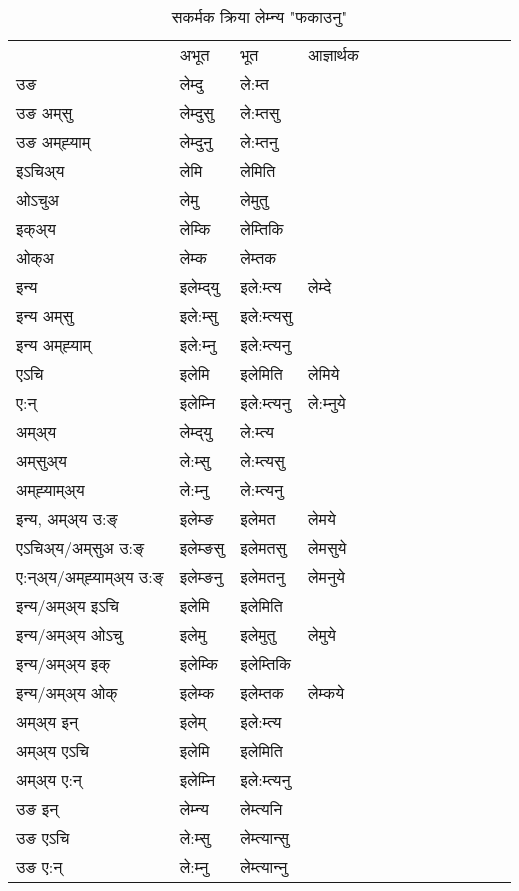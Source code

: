 \begin{table}[H]
\centering
\caption{\label{emt.vt} सकर्मक क्रिया  लेम्‍न्य  "फकाउनु"  }
\begin{tabular}{l|l|l|l|l|l|l|l|l|l|l|l|l}  \toprule
&अभूत & भूत & आज्ञार्थक \\ 
उङ &लेम्दु &ले:म्त \\ 
उङ अम्‌सु&लेम्दुसु &ले:म्तसु \\ 
उङ अम्‌ह्‍याम्&लेम्दुनु &ले:म्तनु \\ 
इऽचिअ्य &लेमि &लेमिति   \\ 
ओऽचुअ        &लेमु &लेमुतु   \\ 
इक्अ्य&लेम्कि &लेम्तिकि   \\ 
ओक्अ &लेम्क &लेम्तक   \\ 
इन्य & इलेम्द्‌यु  & इले:म्त्य &लेम्दे  \\ 
इन्य अम्‌सु& इले:म्सु  & इले:म्त्यसु   \\ 
इन्य अम्‌ह्‍याम्& इले:म्‍नु  & इले:म्त्यनु   \\ 
एऽचि & इलेमि & इलेमिति &लेमिये    \\ 
ए:न् & इलेम्‍नि  & इले:म्त्यनु &ले:म्‍नुये  \\ 
अम्अ्य & लेम्द्‌यु  & ले:म्त्य  \\ 
अम्‌सुअ्य & ले:म्सु & ले:म्त्यसु  \\ 
अम्‌ह्‍याम्अ्य & ले:म्‍नु  & ले:म्त्यनु \\ 
\midrule
इन्य, अम्अ्य उ:ङ्‌ &इलेम्ङ &इलेमत &लेमये \\ 
एऽचिअ्य/अम्‌सुअ उ:ङ्‌ &इलेम्ङसु &इलेमतसु &लेमसुये \\ 
ए:न्अ्य/अम्‌ह्‍याम्अ्य उ:ङ्‌ &इलेम्ङनु &इलेमतनु &लेमनुये \\ 
इन्य/अम्अ्य इऽचि &इलेमि &इलेमिति    \\ 
इन्य/अम्अ्य ओऽचु &इलेमु &इलेमुतु  &लेमुये  \\ 
इन्य/अम्अ्य इक् &इलेम्कि &इलेम्तिकि   \\ 
इन्य/अम्अ्य ओक् &इलेम्क &इलेम्तक  &लेम्कये  \\ 
अम्अ्य इन् & इलेम् & इले:म्त्य   \\ 
अम्अ्य एऽचि & इलेमि & इलेमिति    \\ 
अम्अ्य ए:न् & इलेम्‍नि  & इले:म्त्यनु  \\ 
\midrule
उङ इन् & लेम्‍न्य  & लेम्त्यनि  \\ 
उङ एऽचि & ले:म्सु  & लेम्त्यान्सु   \\ 
उङ ए:न्& ले:म्‍नु  & लेम्त्यान्‍नु   \\ 
\bottomrule
\end{tabular}
\end{table}


